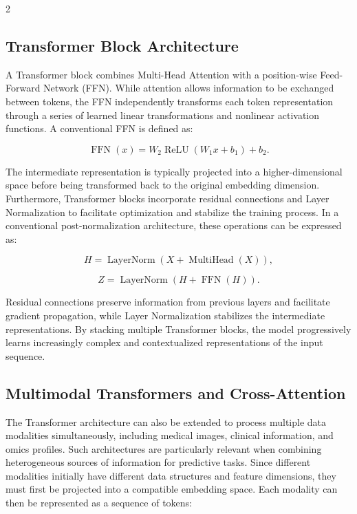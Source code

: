 \documentclass[10pt]{article}
\begin{document}
\begin{multicols}{2}
\subsection{Transformer Block Architecture}
A Transformer block combines Multi-Head Attention with a position-wise Feed-Forward Network (FFN). 
While attention allows information to be exchanged between tokens, 
the FFN independently transforms each token representation through a series of learned linear transformations and nonlinear activation functions.
A conventional FFN is defined as:

\begin{equation}
\operatorname{FFN}(x)
=
W_2\operatorname{ReLU}(W_1x+b_1)+b_2.
\end{equation}

The intermediate representation is typically projected into a higher-dimensional space before being transformed back to the original embedding dimension.
Furthermore, Transformer blocks incorporate residual connections and Layer Normalization to facilitate optimization and stabilize the training process. In a conventional post-normalization architecture, these operations can be expressed as:

\begin{equation}
H =
\operatorname{LayerNorm}
\left(
X+\operatorname{MultiHead}(X)
\right),
\end{equation}

\begin{equation}
Z =
\operatorname{LayerNorm}
\left(
H+\operatorname{FFN}(H)
\right).
\end{equation}

Residual connections preserve information from previous layers and facilitate gradient propagation, 
while Layer Normalization stabilizes the intermediate representations.
By stacking multiple Transformer blocks, 
the model progressively learns increasingly complex and contextualized representations of the input sequence.

\subsection{Multimodal Transformers and Cross-Attention}
The Transformer architecture can also be extended to process multiple data modalities simultaneously, 
including medical images, clinical information, and omics profiles. 
Such architectures are particularly relevant when combining heterogeneous sources of information for predictive tasks.
Since different modalities initially have different data structures and feature dimensions, 
they must first be projected into a compatible embedding space. 
Each modality can then be represented as a sequence of tokens:


\end{multicols}
\end{document}
